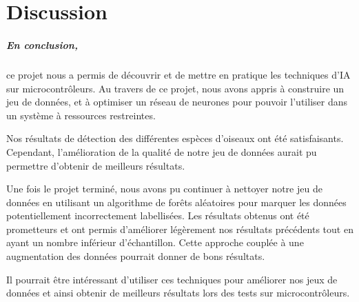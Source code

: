 \chapter{Discussion}

\paragraph{En conclusion,} ce projet nous a permis de découvrir et de mettre en pratique les techniques d'IA sur microcontrôleurs. 
Au travers de ce projet, nous avons appris à construire un jeu de données, 
et à optimiser un réseau de neurones pour pouvoir l'utiliser dans un système à ressources restreintes.

Nos résultats de détection des différentes espèces d'oiseaux ont été satisfaisants. Cependant, 
l'amélioration de la qualité de notre jeu de données aurait pu permettre d'obtenir de meilleurs résultats.

Une fois le projet terminé, nous avons pu continuer à nettoyer notre jeu de données 
en utilisant un algorithme de forêts aléatoires pour marquer les données potentiellement incorrectement labellisées.
Les résultats obtenus ont été prometteurs et ont permis d'améliorer légèrement nos résultats précédents tout en ayant
un nombre inférieur d'échantillon. Cette approche couplée à une augmentation des données 
pourrait donner de bons résultats.

Il pourrait être intéressant d'utiliser ces techniques pour améliorer nos jeux de données et ainsi obtenir
de meilleurs résultats lors des tests sur microcontrôleurs.
